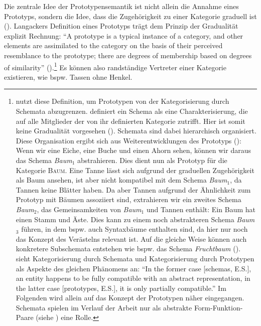 Die zentrale Idee der Prototypensemantik ist nicht allein die Annahme eines Prototyps, sondern die Idee, dass die Zugehörigkeit zu einer Kategorie graduell ist (\cite[15]{MangasserWahl.2000b}). Langackers Definition eines Prototyps trägt dem Prinzip der Gradualität explizit Rechnung: "`A prototype is a typical instance of a category, and other elements are assimilated to the category on the basis of their perceived resemblance to the prototype; there are degrees of membership based on degrees of similarity"' (\cite[371]{Langacker.1987}).\footnote{\textcite[371]{Langacker.1987} nutzt diese Definition, um Prototypen von der Kategorisierung durch Schemata abzugrenzen. \textcite{Langacker.1987} definiert ein Schema als eine Charakterisierung, die auf alle Mitglieder der von ihr definierten Kategorie zutrifft. Hier ist somit keine Gradualität vorgesehen (\cite[530]{Taylor.1990}). Schemata sind dabei hierarchisch organisiert. Diese Organisation ergibt sich aus Weiterentwicklungen des Prototyps (\cite[66]{Taylor.1995}): Wenn wir eine Eiche, eine Buche und einen Ahorn sehen, können wir daraus das Schema \textit{Baum$_1$} abstrahieren. Dies dient nun als Prototyp für die Kategorie \textsc{Baum}. Eine Tanne lässt sich aufgrund der graduellen Zugehörigkeit als Baum ansehen, ist aber nicht kompatibel mit dem Schema \textit{Baum$_1$}, da Tannen keine Blätter haben. Da aber Tannen aufgrund der Ähnlichkeit zum Prototyp mit Bäumen assoziiert sind, extrahieren wir ein zweites Schema \textit{Baum$_2$}, das Gemeinsamkeiten von \textit{Baum$_1$} und Tannen enthält: Ein Baum hat einen Stamm und Äste. Dies kann zu einem noch abstrakteren Schema \textit{Baum$_3$} führen, in dem bspw. auch Syntaxbäume enthalten sind, da hier nur noch das Konzept des Verästelns relevant ist. Auf die gleiche Weise können auch konkretere Subschemata entstehen wie bspw. das Schema \textit{Fruchtbaum} (\cite[66]{Taylor.1995}). \textcite[66]{Taylor.1995} sieht Kategorisierung durch Schemata und Kategorisierung durch Prototypen als Aspekte des gleichen Phänomens an: "`In the former case [schemas, E.S.], an entity happens to be fully compatible with an abstract representation, in the latter case [prototypes, E.S.], it is only partially compatible."' Im Folgenden wird allein auf das Konzept der Prototypen näher eingegangen. Schemata spielen im Verlauf der Arbeit nur als abstrakte Form-Funktion-Paare (siehe ) eine Rolle.} Es können also randständige Vertreter einer Kategorie existieren, wie bspw. Tassen ohne Henkel.

